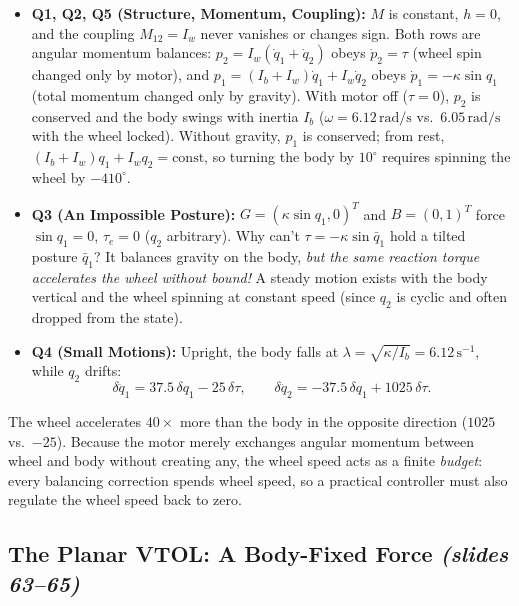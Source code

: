 \documentclass[11pt, a4paper]{article}
\theoremstyle{definition}
\theoremstyle{plain}
\begin{document}
\begin{itemize}
  \item \textbf{Q1, Q2, Q5 (Structure, Momentum, Coupling):} $M$ is constant, $h = 0$, and the coupling $M_{12} = I_w$ never vanishes or changes sign. Both rows are angular momentum balances: $p_2 = I_w(\dot{q}_1+\dot{q}_2)$ obeys $\dot{p}_2 = \tau$ (wheel spin changed only by motor), and $p_1 = (I_b+I_w)\dot{q}_1 + I_w\dot{q}_2$ obeys $\dot{p}_1 = -\kappa\sin q_1$ (total momentum changed only by gravity). With motor off ($\tau=0$), $p_2$ is conserved and the body swings with inertia $I_b$ ($\omega = 6.12\,\mathrm{rad/s}$ vs.\ $6.05\,\mathrm{rad/s}$ with the wheel locked). Without gravity, $p_1$ is conserved; from rest, $(I_b+I_w)q_1 + I_w q_2 = \text{const}$, so turning the body by $10^\circ$ requires spinning the wheel by $-410^\circ$.
  \item \textbf{Q3 (An Impossible Posture):} $G = (\kappa\sin q_1, 0)^T$ and $B = (0,1)^T$ force $\sin q_1 = 0$, $\tau_e = 0$ ($q_2$ arbitrary). Why can't $\tau = -\kappa\sin\bar{q}_1$ hold a tilted posture $\bar{q}_1$? It balances gravity on the body, \emph{but the same reaction torque accelerates the wheel without bound!} A steady motion exists with the body vertical and the wheel spinning at constant speed (since $q_2$ is cyclic and often dropped from the state).
  \item \textbf{Q4 (Small Motions):} Upright, the body falls at $\lambda = \sqrt{\kappa/I_b} = 6.12\,\mathrm{s}^{-1}$, while $q_2$ drifts:
  \[
    \delta\ddot{q}_1 = 37.5\,\delta q_1 - 25\,\delta\tau, \qquad
    \delta\ddot{q}_2 = -37.5\,\delta q_1 + 1025\,\delta\tau.
  \]
\end{itemize}

\begin{intuition}
The wheel accelerates $40\times$ more than the body in the opposite direction ($1025$ vs.\ $-25$). Because the motor merely exchanges angular momentum between wheel and body without creating any, the wheel speed acts as a finite \emph{budget}: every balancing correction spends wheel speed, so a practical controller must also regulate the wheel speed back to zero.
\end{intuition}

\subsection{The Planar VTOL: A Body-Fixed Force \emph{(slides 63--65)}}
\end{document}
